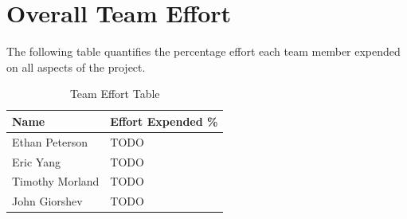 \documentclass[letterpaper,11pt]{article}
\begin{document}
\section{Overall Team Effort}
The following table quantifies the percentage effort each team member expended
on all aspects of the project.

\begin{table}[H]
  \caption{Team Effort Table}
  \centering
  \begin{tabularx}{10cm}{l|l}
    \textbf{Name} & \textbf{Effort Expended \%}\\
    \hline
    Ethan Peterson & TODO \\
    \hline
    Eric Yang & TODO \\
    \hline
    Timothy Morland & TODO \\
    \hline
    John Giorshev & TODO \\
  \end{tabularx} 
\end{table}
\newpage




\newpage
{}
\newcommand{\changelocaltocdepth}[1]{%
  \addtocontents{toc}{\protect\setcounter{tocdepth}{#1}}%
  \setcounter{tocdepth}{#1}%
}
\changelocaltocdepth{1}

\pagestyle{empty}
\end{document}
